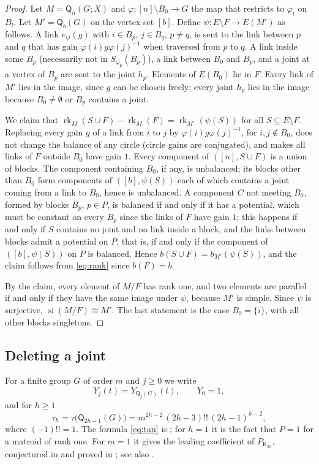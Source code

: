 \documentclass[11pt]{amsart}
\theoremstyle{definition}
\theoremstyle{remark}
\numberwithin{equation}{section}
\newcommand{\Q}{\mathsf{Q}}
\newcommand{\K}{\mathsf{K}}
\newcommand{\rk}{\operatorname{rk}}
\newcommand{\si}{\operatorname{si}}
\begin{document}
\begin{proof}
Let $M=\Q_n(G;X)$ and $\varphi\colon[n]\setminus B_0\to G$ the map that restricts to $\varphi_l$ on $B_l$. Let $M'=\Q_b(G)$ on the vertex set $[b]$. Define $\psi\colon E\setminus F\to E(M')$ as follows. A link $e_{ij}(g)$ with $i\in B_p$, $j\in B_q$, $p\ne q$, is sent to the link between $p$ and $q$ that has gain $\varphi(i)g\varphi(j)^{-1}$ when traversed from $p$ to $q$. A link inside some $B_p$ (necessarily not in $S_{\varphi_p}(B_p)$), a link between $B_0$ and $B_p$, and a joint at a vertex of $B_p$ are sent to the joint $h_p$. Elements of $E(B_0)$ lie in $F$. Every link of $M'$ lies in the image, since $g$ can be chosen freely; every joint $h_p$ lies in the image because $B_0\neq\emptyset$ or $B_p$ contains a joint.

We claim that $\rk_M(S\cup F)-\rk_M(F)=\rk_{M'}(\psi(S))$ for all $S\subseteq E\setminus F$. Replacing every gain $g$ of a link from $i$ to $j$ by $\varphi(i)g\varphi(j)^{-1}$, for $i,j\notin B_0$, does not change the balance of any circle (circle gains are conjugated), and makes all links of $F$ outside $B_0$ have gain $1$. Every component of $([n],S\cup F)$ is a union of blocks. The component containing $B_0$, if any, is unbalanced; its blocks other than $B_0$ form components of $([b],\psi(S))$ each of which contains a joint coming from a link to $B_0$, hence is unbalanced. A component $C$ not meeting $B_0$, formed by blocks $B_p$, $p\in P$, is balanced if and only if it has a potential, which must be constant on every $B_p$ since the links of $F$ have gain $1$; this happens if and only if $S$ contains no joint and no link inside a block, and the links between blocks admit a potential on $P$, that is, if and only if the component of $([b],\psi(S))$ on $P$ is balanced. Hence $b(S\cup F)=b_{M'}(\psi(S))$, and the claim follows from \eqref{eq:rank} since $b(F)=b$.

By the claim, every element of $M/F$ has rank one, and two elements are parallel if and only if they have the same image under $\psi$, because $M'$ is simple. Since $\psi$ is surjective, $\si(M/F)\cong M'$. The last statement is the case $B_0=\{i\}$, with all other blocks singletons.
\end{proof}

\subsection{Deleting a joint}
For a finite group $G$ of order $m$ and $j\ge0$ we write
\[
Y_j(t)=Y_{\Q_j(G)}(t),\qquad Y_0=1,
\]
and for $h\ge1$
\begin{equation}\label{eq:tau}
\tau_h=\tau\bigl(\Q_{2h-1}(G)\bigr)=m^{2h-2}\,(2h-3)!!\,(2h-1)^{h-2},
\end{equation}
where $(-1)!!=1$. The formula \eqref{eq:tau} is \cite[Example~4.2]{FL26}; for $h=1$ it is the fact that $P=1$ for a matroid of rank one. For $m=1$ it gives the leading coefficient of $P_{\K_{2h}}$, conjectured in \cite{EPW16} and proved in \cite{FL24}; see also \cite[Theorem~2]{GPYZ23}.
\end{document}
